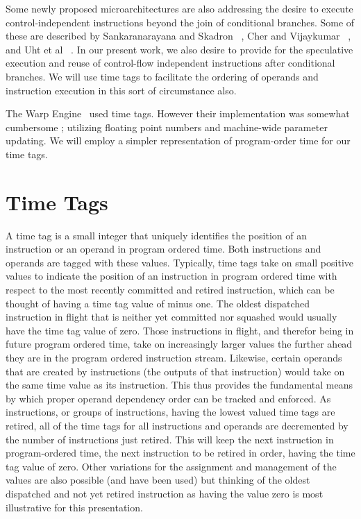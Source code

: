 \documentclass[10pt,dvips]{article}
\begin{document}
Some newly proposed microarchitectures are also addressing
the desire to execute control-independent instructions
beyond the join of conditional branches.
Some of these are described by 
Sankaranarayana and Skadron ~\cite{Sank01a,Sank01b}, Cher and
Vijaykumar ~\cite{Cher01}, and Uht et al ~\cite{Uht01}.
In our present work, we also desire to provide for the speculative
execution and reuse of control-flow independent instructions
after conditional branches.  We will use time tags
to facilitate the ordering of operands and instruction execution in this
sort of circumstance also.

The Warp Engine~\cite{Cleary95} used time tags.  
However their implementation
was somewhat cumbersome ; utilizing 
floating point numbers and machine-wide parameter
updating.  
We will employ a simpler representation of program-order time for our time
tags.
%
%
\section{Time Tags}
%
A time tag is a small
integer that uniquely identifies the position of an instruction
or an operand in program ordered time.
Both instructions and operands are tagged with these values.
Typically, time tags take on small positive values to
indicate the position of an instruction in program ordered
time with respect to the most recently committed and retired
instruction, which can be thought of having a time tag value
of minus one.
The oldest dispatched instruction in flight that is neither 
yet committed nor
squashed would usually have the time tag value of zero.
Those instructions in flight, and therefor being
in future program
ordered time, take on increasingly larger values the further ahead
they are in the program ordered instruction stream.
Likewise, certain operands that are created by instructions 
(the outputs of that instruction) would take on
the same time value as its instruction.  
This thus provides
the fundamental means by which proper operand dependency order can
be tracked and enforced.
As instructions, or groups of instructions,
having the lowest valued time tags
are retired, all of the time tags for all instructions and
operands are decremented by the number of instructions just
retired.  This will keep the next instruction in program-ordered
time, the next instruction to be retired in order,
having the time tag value of zero.
Other variations for the assignment and management of the
values are also possible (and have been used) but thinking 
of the oldest dispatched
and not yet retired instruction as having the value zero is
most illustrative for this presentation.
\end{document}
